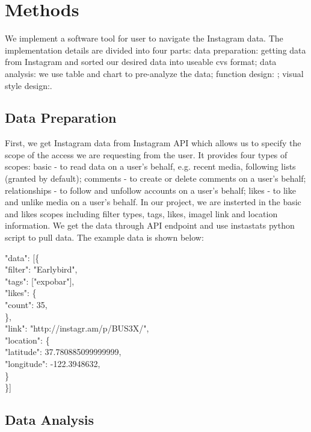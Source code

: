 \documentclass[conference]{acmsiggraph}
\begin{document}
\section{Methods}

We implement a software tool for user to navigate the Instagram data. The implementation details are divided into four parts: data preparation: getting data from Instagram and sorted our desired data into useable cvs format; data analysis: we use table and chart to pre-analyze the data; function design: ; visual style design:.

\subsection{Data Preparation}

First, we get Instagram data from Instagram API which allows us to specify the scope of the access we are requesting from the user. It provides four types of scopes: basic - to read data on a user’s behalf, e.g. recent media, following lists (granted by default); comments - to create or delete comments on a user’s behalf; relationships - to follow and unfollow accounts on a user’s behalf; likes - to like and unlike media on a user’s behalf. In our project, we are insterted in the basic and likes scopes including filter types, tags, likes, imagel link and location information. We get the data through API endpoint and use instastats python script to pull data. The example data is shown below:

"data": [\{\\
\text{\quad}        "filter": "Earlybird",\\
\text{\quad}        "tags": ["expobar"],\\
\text{\quad}        "likes": \{\\
\text{\quad \quad}              "count": 35,\\
\text{\quad}        \},\\
\text{\quad}        "link": "http://instagr.am/p/BUS3X/",\\
\text{\quad}        "location": \{\\
\text{\quad \quad}            "latitude": 37.780885099999999,\\
\text{\quad \quad}            "longitude": -122.3948632,\\
\text{\quad}        \}\\
    \}]



\subsection{Data Analysis}
\end{document}
